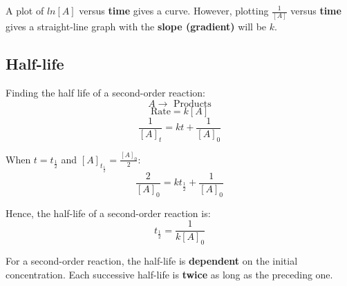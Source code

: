 \documentclass[11pt]{article}
\begin{document}
A plot of \(ln[A]\) versus \textbf{time} gives a curve. However, plotting \(\frac{1}{[A]}\) versus \textbf{time} gives a straight-line graph with the \textbf{slope (gradient)} will be \(k\).

\subsection{Half-life}
\label{sec:org48cc9c2}

Finding the half life of a second-order reaction:
\[A \rightarrow \text{ Products}\]
\[\text{Rate} = k[A]\]
\[\frac{1}{[A]_t} = kt + \frac{1}{[A]_0}\]

When \(t = t_{\frac{1}{2}}\) and \([A]_{t_{\frac{1}{2}}} = \frac{[A]_0}{2}\):
\[\frac{2}{[A]_0} = kt_{\frac{1}{2}} + \frac{1}{[A]_0}\]

Hence, the half-life of a second-order reaction is:
\[t_{\frac{1}{2}} = \frac{1}{k[A]_0}\]

For a second-order reaction, the half-life is \textbf{dependent} on the initial concentration. Each successive half-life is \textbf{twice} as long as the preceding one.
\end{document}
